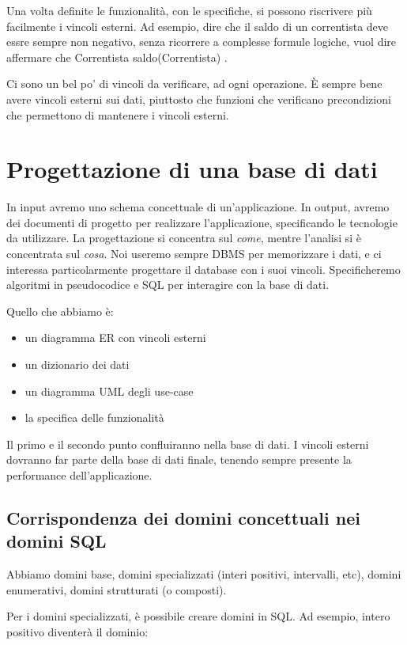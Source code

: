 Una volta definite le funzionalit\`a, con le specifiche, si possono riscrivere pi\`u facilmente i vincoli esterni. Ad esempio, dire che il saldo di un correntista deve essre sempre non negativo, senza ricorrere a complesse formule logiche, vuol dire affermare che \forall Correntista \implies saldo(Correntista) .

Ci sono un bel po' di vincoli da verificare, ad ogni operazione. \`E sempre bene avere vincoli esterni sui dati, piuttosto che funzioni che verificano precondizioni che permettono di mantenere i vincoli esterni.

\section{Progettazione di una base di dati}

In input avremo uno schema concettuale di un'applicazione. In output, avremo dei documenti di progetto per realizzare l'applicazione, specificando le tecnologie da utilizzare. La progettazione si concentra sul \emph{come}, mentre l'analisi si \`e concentrata sul \emph{cosa}. Noi useremo sempre DBMS per memorizzare i dati, e ci interessa particolarmente progettare il database con i suoi vincoli. Specificheremo algoritmi in pseudocodice e SQL per interagire con la base di dati.

Quello che abbiamo \`e:
\begin{itemize}
    \item un diagramma ER con vincoli esterni
    \item un dizionario dei dati
    \item un diagramma UML degli use-case
    \item la specifica delle funzionalit\`a
\end{itemize}

Il primo e il secondo punto confluiranno nella base di dati. I vincoli esterni dovranno far parte della base di dati finale, tenendo sempre presente la performance dell'applicazione.

\subsection{Corrispondenza dei domini concettuali nei domini SQL}

Abbiamo domini base, domini specializzati (interi positivi, intervalli, etc), domini enumerativi, domini strutturati (o composti).

Per i domini specializzati, \`e possibile creare domini in SQL. Ad esempio, intero positivo diventer\`a il dominio:

